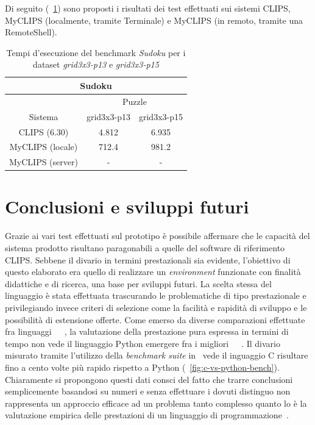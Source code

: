 Di seguito (\tablename~\ref{tab:bench-sudoku}) sono proposti i risultati dei test effettuati sui sistemi CLIPS, MyCLIPS (localmente, tramite Terminale) e MyCLIPS (in remoto, tramite una RemoteShell).


\begin{table}[h]
\caption{Tempi d'esecuzione del benchmark \emph{Sudoku} per i dataset \emph{grid3x3-p13} e \emph{grid3x3-p15}}\label{tab:bench-sudoku}
\centering
\begin{tabular}{|c||c|c|}
\hline 
\multicolumn{3}{|c|}{Sudoku} \\ 
\hline 
 & \multicolumn{2}{c|}{Puzzle} \\ 
\hline 
Sistema & grid3x3-p13 & grid3x3-p15 \\ 
\hline\hline
CLIPS (6.30) & 4.812 & 6.935 \\ 
\hline 
MyCLIPS (locale) & 712.4 & 981.2 \\ 
\hline 
MyCLIPS (server) & - & - \\ 
\hline 
\end{tabular} 
\end{table}


\section{Conclusioni e sviluppi futuri}

Grazie ai vari test effettuati sul prototipo è possibile affermare che le capacità del sistema prodotto risultano paragonabili a quelle del software di riferimento CLIPS. Sebbene il divario in termini prestazionali sia evidente, l'obiettivo di questo elaborato era quello di realizzare un \emph{environment} funzionate con finalità didattiche e di ricerca, una base per sviluppi futuri. La scelta stessa del linguaggio è stata effettuata trascurando le problematiche di tipo prestazionale e privilegiando invece criteri di selezione come la facilità e rapidità di sviluppo e le possibilità di estensione offerte. Come emerso da diverse comparazioni effettuate fra linguaggi~\cite{prashant2008}~\cite{prechelt2000}~\cite{naiditch1999}, la valutazione della prestazione pura espressa in termini di tempo non vede il linguaggio Python emergere fra i migliori~\cite{cpybench}~\cite{prashant2008}~\cite{prechelt2000}. Il divario misurato tramite l'utilizzo della \emph{benchmark suite} in~\cite{cpybench} vede il inguaggio C risultare fino a cento volte più rapido rispetto a Python (\figurename~\ref{fig:c-vs-python-bench}). Chiaramente si propongono questi dati consci del fatto che trarre conclusioni semplicemente basandosi su numeri e senza effettuare i dovuti distinguo non rappresenta un approccio efficace ad un problema tanto complesso quanto lo è la valutazione empirica delle prestazioni di un linguaggio di programmazione~\cite{algorithms}.

